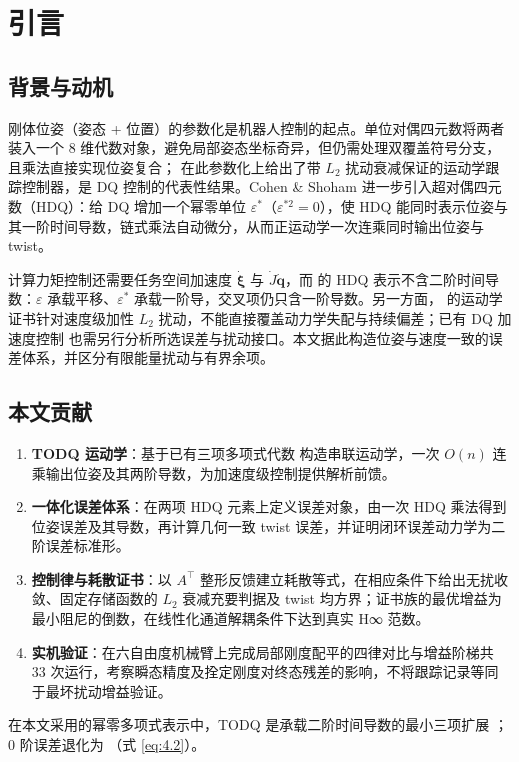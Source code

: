 \section{引言}

\subsection{背景与动机}

刚体位姿（姿态 + 位置）的参数化是机器人控制的起点。单位对偶四元数将两者装入一个 8 维代数对象，避免局部姿态坐标奇异，但仍需处理双覆盖符号分支，且乘法直接实现位姿复合；\cite{P2} 在此参数化上给出了带 $L_2$ 扰动衰减保证的运动学跟踪控制器，是 DQ 控制的代表性结果。Cohen \& Shoham \cite{P1} 进一步引入超对偶四元数（HDQ）：给 DQ 增加一个幂零单位 $\varepsilon^*$（$\varepsilon^{*2}=0$），使 HDQ 能同时表示位姿与其一阶时间导数，链式乘法自动微分，从而正运动学一次连乘同时输出位姿与 twist。

计算力矩控制还需要任务空间加速度 $\dot{\boldsymbol\xi}$ 与 $\dot J\dot{\boldsymbol q}$，而 \cite{P1} 的 HDQ 表示不含二阶时间导数：$\varepsilon$ 承载平移、$\varepsilon^*$ 承载一阶导，交叉项仍只含一阶导数。另一方面，\cite{P2} 的运动学证书针对速度级加性 $L_2$ 扰动，不能直接覆盖动力学失配与持续偏差；已有 DQ 加速度控制 \cite{Ch20} 也需另行分析所选误差与扰动接口。本文据此构造位姿与速度一致的误差体系，并区分有限能量扰动与有界余项。

\subsection{本文贡献}

\begin{enumerate}[leftmargin=2em]
  \item \textbf{TODQ 运动学}：基于已有三项多项式代数 \cite{Con25} 构造串联运动学，一次 $O(n)$ 连乘输出位姿及其两阶导数，为加速度级控制提供解析前馈。
  \item \textbf{一体化误差体系}：在两项 HDQ 元素上定义误差对象，由一次 HDQ 乘法得到位姿误差及其导数，再计算几何一致 twist 误差，并证明闭环误差动力学为二阶误差标准形。
  \item \textbf{控制律与耗散证书}：以 $A^\top$ 整形反馈建立耗散等式，在相应条件下给出无扰收敛、固定存储函数的 $L_2$ 衰减充要判据及 twist 均方界；证书族的最优增益为最小阻尼的倒数，在线性化通道解耦条件下达到真实 H∞ 范数。
  \item \textbf{实机验证}：在六自由度机械臂上完成局部刚度配平的四律对比与增益阶梯共 33 次运行，考察瞬态精度及拴定刚度对终态残差的影响，不将跟踪记录等同于最坏扰动增益验证。
\end{enumerate}

在本文采用的幂零多项式表示中，TODQ 是承载二阶时间导数的最小三项扩展 \cite{Con25}；0 阶误差退化为 \cite{P2}（式 \eqref{eq:4.2}）。
